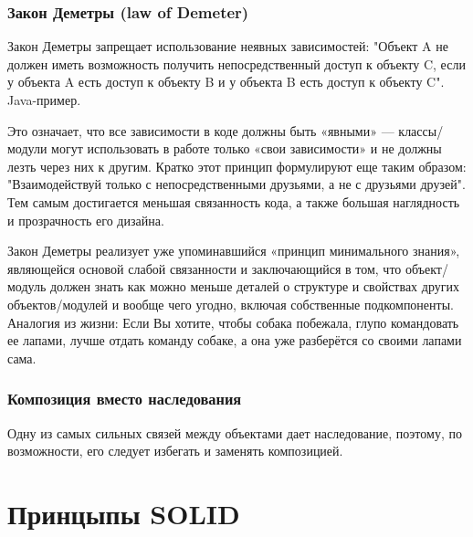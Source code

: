 \documentclass[a4paper]{article}
\begin{document}
\subsubsection{Закон Деметры (law of Demeter)}

Закон Деметры запрещает использование неявных зависимостей: "Объект A не должен иметь возможность получить непосредственный доступ к объекту C, если у объекта A есть доступ к объекту B и у объекта B есть доступ к объекту C". Java-пример.

Это означает, что все зависимости в коде должны быть «явными» — классы/модули могут использовать в работе только «свои зависимости» и не должны лезть через них к другим. Кратко этот принцип формулируют еще таким образом: "Взаимодействуй только с непосредственными друзьями, а не с друзьями друзей". Тем самым достигается меньшая связанность кода, а также большая наглядность и прозрачность его дизайна.

Закон Деметры реализует уже упоминавшийся «принцип минимального знания», являющейся основой слабой связанности и заключающийся в том, что объект/модуль должен знать как можно меньше деталей о структуре и свойствах других объектов/модулей и вообще чего угодно, включая собственные подкомпоненты. Аналогия из жизни: Если Вы хотите, чтобы собака побежала, глупо командовать ее лапами, лучше отдать команду собаке, а она уже разберётся со своими лапами сама.

\subsubsection{Композиция вместо наследования}

Одну из самых сильных связей между объектами дает наследование, поэтому, по возможности, его следует избегать и заменять композицией.

\newpage
\section{Принцыпы SOLID}
\end{document}
